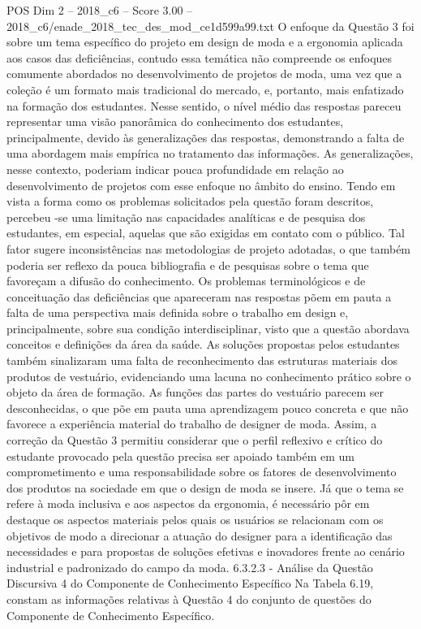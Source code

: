 \begin{textsample}{POS Dim 2 – 2018\_c6 – Score 3.00 – 2018\_c6/enade\_2018\_tec\_des\_mod\_ce1d599a99.txt}
O enfoque da Questão 3 foi sobre um tema específico do projeto em design de moda e a ergonomia aplicada aos casos das deficiências, contudo essa temática não compreende os enfoques comumente abordados no desenvolvimento de projetos de moda, uma vez que a coleção é um formato mais tradicional do mercado, e, portanto, mais enfatizado na formação dos estudantes.
Nesse sentido, o nível médio das respostas pareceu representar uma visão panorâmica do conhecimento dos estudantes, principalmente, devido às generalizações das respostas, demonstrando a falta de uma abordagem mais empírica no tratamento das informações.
As generalizações, nesse contexto, poderiam indicar pouca profundidade em relação ao desenvolvimento de projetos com esse enfoque no âmbito do ensino.
Tendo em vista a forma como os problemas solicitados pela questão foram descritos, percebeu -se uma limitação nas capacidades analíticas e de pesquisa dos estudantes, em especial, aquelas que são exigidas em contato com o público.
Tal fator sugere inconsistências nas metodologias de projeto adotadas, o que também poderia ser reflexo da pouca bibliografia e de pesquisas sobre o tema que favoreçam a difusão do conhecimento.
Os problemas terminológicos e de conceituação das deficiências que apareceram nas respostas põem em pauta a falta de uma perspectiva mais definida sobre o trabalho em design e, principalmente, sobre sua condição interdisciplinar, visto que a questão abordava conceitos e definições da área da saúde.
As soluções propostas pelos estudantes também sinalizaram uma falta de reconhecimento das estruturas materiais dos produtos de vestuário, evidenciando uma lacuna no conhecimento prático sobre o objeto da área de formação.
As funções das partes do vestuário parecem ser desconhecidas, o que põe em pauta uma aprendizagem pouco concreta e que não favorece a experiência material do trabalho de designer de moda.
Assim, a correção da Questão 3 permitiu considerar que o perfil reflexivo e crítico do estudante provocado pela questão precisa ser apoiado também em um comprometimento e uma responsabilidade sobre os fatores de desenvolvimento dos produtos na sociedade em que o design de moda se insere.
Já que o tema se refere à moda inclusiva e aos aspectos da ergonomia, é necessário pôr em destaque os aspectos materiais pelos quais os usuários se relacionam com os objetivos de modo a direcionar a atuação do designer para a identificação das necessidades e para propostas de soluções efetivas e inovadores frente ao cenário industrial e padronizado do campo da moda. 6.3.2.3 - Análise da Questão Discursiva 4 do Componente de Conhecimento Específico Na Tabela 6.19, constam as informações relativas à Questão 4 do conjunto de questões do Componente de Conhecimento Específico.

\end{textsample}
